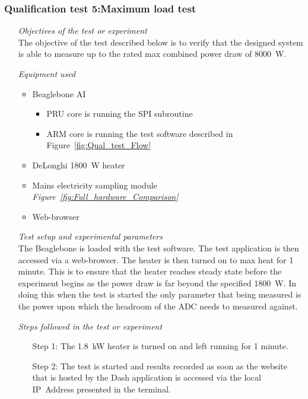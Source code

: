 \subsubsection{Qualification test 5:Maximum load test}
\label{sec:Max_laod_test}
\begin{itemize}
    \item [\emph{Objectives of the test or experiment}]\mbox{}\\
    The objective of the test described below is to verify that the designed system is able to measure up to the rated max combined power draw of \qty{8000}{\watt}.
    \item [\emph{Equipment used}]\mbox{}
    \begin{itemize} 
        \item Beaglebone AI 
        \begin{itemize}
            \item PRU core is running the SPI subroutine 
            \item ARM core is running the test software described in Figure~\ref{fig:Qual_test_Flow}
        \end{itemize}
        \item DeLonghi \qty{1800}{\watt} heater
        \item Mains electricity sampling module \emph{Figure~\ref{fig:Full_hardware_Comparison}}
        \item Web-browser
    \end{itemize}
    \item [\emph{Test setup and experimental parameters}]\mbox{}\\
    The Beaglebone is loaded with the test software. The test application is then accessed via a web-browser. The heater is then turned on to max heat for 1 minute. This is to ensure that the heater reaches steady state before the experiment begins as the power draw is far beyond the specified \qty{1800}{\watt}. In doing this when the test is started the only parameter that being measured is the power upon which the headroom of the ADC needs to measured against.
    \item [\emph{Steps followed in the test or experiment}]\mbox{}
    \begin{itemize}
        \item [Step 1:] The \qty{1.8}{\kW} heater is turned on and left running for 1 minute.
        \item [Step 2:] The test is started and results recorded as soon as the website that is hosted by the Dash application is accessed via the local IP~Address presented in the terminal.

\end{itemize}
\end{itemize}
